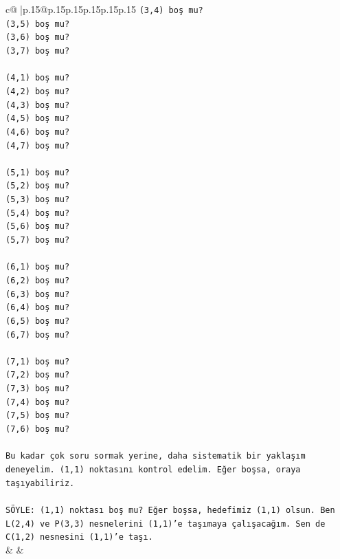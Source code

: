 \documentclass{article}
\begin{document}
{\begin{supertabular}{c@{$\;$}|p{.15\linewidth}@{}p{.15\linewidth}p{.15\linewidth}p{.15\linewidth}p{.15\linewidth}p{.15\linewidth}}
{{{\texttt{(3,4) boş mu?} \\
\texttt{(3,5) boş mu?} \\
\texttt{(3,6) boş mu?} \\
\texttt{(3,7) boş mu?} \\
\\ 
\texttt{(4,1) boş mu?} \\
\texttt{(4,2) boş mu?} \\
\texttt{(4,3) boş mu?} \\
\texttt{(4,5) boş mu?} \\
\texttt{(4,6) boş mu?} \\
\texttt{(4,7) boş mu?} \\
\\ 
\texttt{(5,1) boş mu?} \\
\texttt{(5,2) boş mu?} \\
\texttt{(5,3) boş mu?} \\
\texttt{(5,4) boş mu?} \\
\texttt{(5,6) boş mu?} \\
\texttt{(5,7) boş mu?} \\
\\ 
\texttt{(6,1) boş mu?} \\
\texttt{(6,2) boş mu?} \\
\texttt{(6,3) boş mu?} \\
\texttt{(6,4) boş mu?} \\
\texttt{(6,5) boş mu?} \\
\texttt{(6,7) boş mu?} \\
\\ 
\texttt{(7,1) boş mu?} \\
\texttt{(7,2) boş mu?} \\
\texttt{(7,3) boş mu?} \\
\texttt{(7,4) boş mu?} \\
\texttt{(7,5) boş mu?} \\
\texttt{(7,6) boş mu?} \\
\\ 
\texttt{Bu kadar çok soru sormak yerine, daha sistematik bir yaklaşım deneyelim. (1,1) noktasını kontrol edelim. Eğer boşsa, oraya taşıyabiliriz.} \\
\\ 
\texttt{SÖYLE: (1,1) noktası boş mu? Eğer boşsa, hedefimiz (1,1) olsun. Ben L(2,4) ve P(3,3) nesnelerini (1,1)'e taşımaya çalışacağım. Sen de C(1,2) nesnesini (1,1)'e taşı.} \\
            }
        }
    }
    & & \\ \\


\end{supertabular}}
\end{document}
